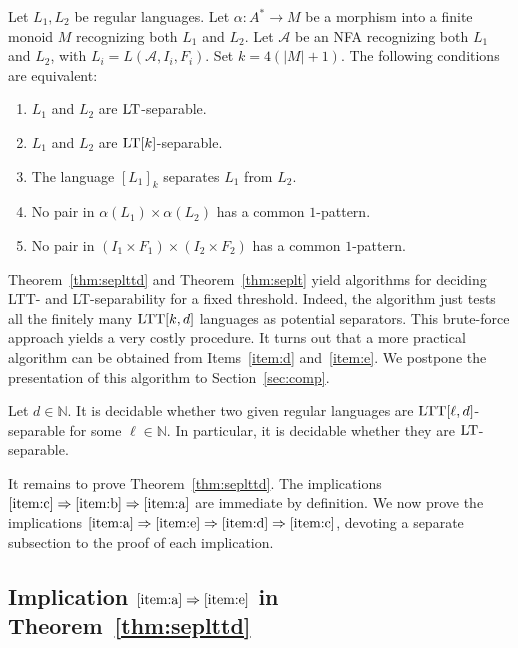 \documentclass{LMCS}
\newcommand\nat{\ensuremath{\mathbb{N}}\xspace}
\newcommand\As{\ensuremath{\mathcal{A}}\xspace}
\newcommand{\lt}{\textup{LT}\xspace}
\newcommand{\ltt}{\textup{LTT}\xspace}
\newcommand{\ltclos}[2]{\ensuremath{[#1]_{#2}}}
\theoremstyle{plain}
\begin{document}
\begin{thm}
  \label{thm:seplt}
  Let $L_1,L_2$ be regular languages. Let $\alpha:A^*\to M$ be a
  morphism into a finite monoid $M$ recognizing both $L_1$ and $L_2$. Let $\As$ be an NFA
  recognizing both $L_1$ and $L_2$, with $L_i=L(\As,I_i,F_i)$. Set
  $k=4(|M|+1)$. The following conditions are equivalent:
  \begin{enumerate}
  \item\label{item:a2} $L_1$ and $L_2$ are $\lt$-separable.
  \item\label{item:b2} $L_1$ and $L_2$ are $\lt[k]$-separable.
  \item\label{item:c2} The language $\ltclos{L_1}{k}$ separates
    $L_1$ from $L_2$.
  \item\label{item:d2} No pair in $\alpha(L_1)\times\alpha(L_2)$ has a common $1$-pattern.
  \item\label{item:e2} No pair in $(I_1\times F_1) \times(I_2\times F_2)$  has a common $1$-pattern.
  \end{enumerate}
\end{thm}

Theorem~\ref{thm:seplttd} and Theorem~\ref{thm:seplt} yield algorithms
for deciding \ltt- and \lt-separability for a fixed threshold. Indeed,
the algorithm just tests all the finitely many $\ltt[k,d]$ languages
as potential separators. This brute-force approach yields a very
costly procedure. It turns out that a more practical algorithm can be
obtained from Items~\eqref{item:d} and~\eqref{item:e}. We postpone
the presentation of this algorithm to Section~\ref{sec:comp}.

\begin{cor} \label{cor:decidltd}
Let $d \in \nat$. It is decidable whether two given regular languages
are $\ltt[\ell,d]$-separable for some $\ell \in \nat$. In particular,
it is decidable whether they are $\lt$-separable.
\end{cor}

It remains to prove Theorem~\ref{thm:seplttd}. The implications
$\eqref{item:c} \Rightarrow \eqref{item:b} \Rightarrow \eqref{item:a}$
are immediate by definition.  We now prove the implications
$\eqref{item:a} \Rightarrow \eqref{item:e}\Rightarrow\eqref{item:d}
\Rightarrow \eqref{item:c}$, devoting a separate subsection to the proof of each implication.

\subsection{\texorpdfstring{Implication $\eqref{item:a} \Rightarrow \eqref{item:e}$ in
  Theorem~\ref{thm:seplttd}}{{Implication  (\ref{item:a}) => (\ref{item:e}) in
  Theorem \ref{thm:seplttd}}}}
\end{document}
